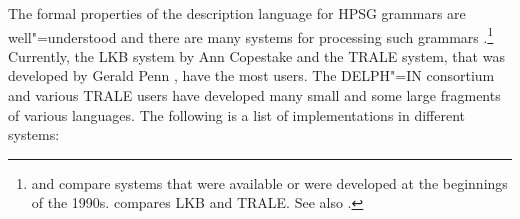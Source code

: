 The formal properties of the description language for HPSG grammars are well"=understood and there are
many systems for processing such grammars
\citep*{DS91a,%
DD93a-u,%
PV91a-u,%
DISCO94,%
%
Erbach95a,%
Schuetz96,STRD96a-u,%
SRTD96a,%
UBCCDDEEMMO-96a,Babel,Mueller2004b,%
CP96,PC99,%
GMG97a-u,%
Copestake2002a,%
Callmeier00a-u,%
Dahlloef2003a-u,%
MPR2002a-u,Penn2004a-u,%
Mueller2007b,%
Sato2008a-u,%
Kaufmann2009a-u%
}.\footnote{
\citet{UBCCDDEEMMO-96a} and \citet{Bolc:Czuba:ea:96a-u} compare systems that were available or were
developed at the beginnings of the 1990s. \citet{MelnikHandWritten-andere-anfuehrungszeichen}
compares LKB and TRALE. See also .
}
Currently, the LKB system by Ann Copestake and the TRALE
system, that was developed by Gerald Penn \citep*{MPR2002a-u,Penn2004a-u}, have the most users. The
DELPH"=IN consortium and various TRALE users have developed many small and some
large fragments of various languages. The following is a list of implementations in different systems:
